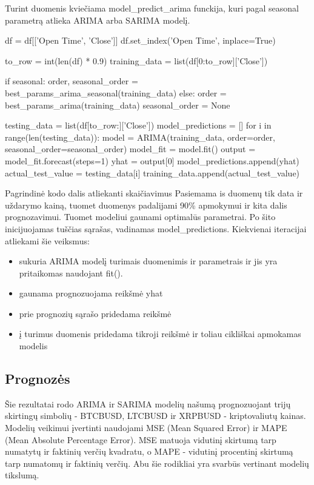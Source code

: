 \documentclass{VUMIFInfKursinis}
\begin{document}
Turint duomenis kviečiama model\_predict\_arima funckija, kuri pagal seasonal parametrą atlieka ARIMA arba SARIMA modelį.

\begin{python}
  df = df[['Open Time', 'Close']]
  df.set_index('Open Time', inplace=True)
  
  to_row = int(len(df) * 0.9)
  training_data = list(df[0:to_row]['Close'])
  
  if seasonal:
  order, seasonal_order = best_params_arima_seasonal(training_data)
  else:
  order = best_params_arima(training_data)
  seasonal_order = None
  
  testing_data = list(df[to_row:]['Close'])
  model_predictions = []
  for i in range(len(testing_data)):
  model = ARIMA(training_data, order=order, seasonal_order=seasonal_order)
  model_fit = model.fit()
  output = model_fit.forecast(steps=1)
  yhat = output[0]
  model_predictions.append(yhat)
  actual_test_value = testing_data[i]
  training_data.append(actual_test_value)
\end{python}

Pagrindinė kodo dalis atliekanti skaičiavimus
Pasiemama is duomenų tik data ir uždarymo kainą, tuomet duomenys padalijami 90\% apmokymui ir kita dalis prognozavimui. Tuomet modeliui gaunami 
optimalūs parametrai. Po šito inicijuojamas tuščias sąrašas, vadinamas model\_predictions. Kiekvienai iteracijai atliekami šie veiksmus:

\begin{itemize}
  \item sukuria ARIMA modelį turimais duomenimis ir parametrais ir jis yra pritaikomas naudojant fit().
  \item gaunama prognozuojama reikšmė yhat
  \item prie prognozių sąrašo pridedama reikšmė
  \item į turimus duomenis pridedama tikroji reikšmė ir toliau cikliškai apmokamas modelis
\end{itemize}

\subsection{Prognozės}

Šie rezultatai rodo ARIMA ir SARIMA modelių našumą prognozuojant trijų skirtingų simbolių - BTCBUSD, LTCBUSD ir XRPBUSD - kriptovaliutų kainas.
Modelių veikimui įvertinti naudojami MSE (Mean Squared Error) ir MAPE (Mean Absolute Percentage Error). 
MSE matuoja vidutinį skirtumą tarp numatytų ir faktinių verčių kvadratu, o MAPE - vidutinį procentinį skirtumą tarp numatomų ir faktinių verčių. 
Abu šie rodikliai yra svarbūs vertinant modelių tikslumą.
\end{document}
